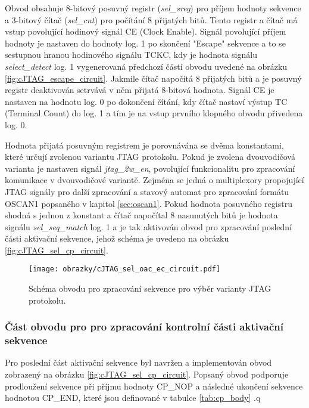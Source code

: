 Obvod obsahuje 8-bitový posuvný registr (\textit{sel\_sreg}) pro příjem hodnoty sekvence a 3-bitový čítač (\textit{sel\_cnt}) pro počítání 8 přijatých bitů. Tento registr a čítač má vstup povolující hodinový signál CE (Clock Enable). Signál povolující příjem hodnoty je nastaven do hodnoty log. 1 po skončení "Escape" sekvence a to se sestupnou hranou hodinového signálu TCKC, kdy je hodnota signálu \textit{select\_detect} log. 1 vygenerovaná předchozí částí obvodu uvedené na obrázku \ref{fig:cJTAG_escape_circuit}. Jakmile čítač napočítá 8 přijatých bitů a je posuvný registr deaktivován setrvává v něm přijatá 8-bitová hodnota. Signál CE je nastaven na hodnotu log. 0 po dokončení čítání, kdy čítač nastaví výstup TC (Terminal Count) do log. 1 a tím je na vstup prvního klopného obvodu přivedena log. 0.

Hodnota přijatá posuvným registrem je porovnávána se dvěma konstantami, které určují zvolenou variantu \acs{JTAG} protokolu. Pokud je zvolena dvouvodičová varianta je nastaven signál \textit{jtag\_2w\_en}, povolující funkcionalitu pro zpracování komunikace v dvouvodičové variantě. Zejména se jedná o multiplexory propojující \acs{JTAG} signály pro další zpracování a stavový automat pro  zpracování formátu OSCAN1 popsaného v kapitol \ref{sec:oscan1}. Pokud hodnota posuvného registru shodná s jednou z konstant a čítač napočítal 8 nasunutých bitů je hodnota signálu \textit{sel\_seq\_match} log. 1 a je tak aktivován obvod pro zpracování poslední části aktivační sekvence, jehož schéma je uvedeno na obrázku \ref{fig:cJTAG_sel_cp_circuit}. 


\begin{figure}[!h]
  \begin{center}
    \texttt{[image: obrazky/cJTAG\_sel\_oac\_ec\_circuit.pdf]}
  \end{center}
  \caption{Schéma obvodu pro zpracování sekvence pro výběr varianty JTAG protokolu.}
	\label{fig:cJTAG_sel_oac_ec_circuit}
\end{figure}

\subsubsection{Část obvodu pro pro zpracování kontrolní části aktivační sekvence}
Pro poslední část aktivační sekvence byl navržen a implementován obvod zobrazený na obrázku \ref{fig:cJTAG_sel_cp_circuit}. Popsaný obvod podporuje prodloužení sekvence při příjmu hodnoty CP\_NOP a následné ukončení sekvence hodnotou CP\_END, které jsou definované v tabulce \ref{tab:cp_body} .q %

